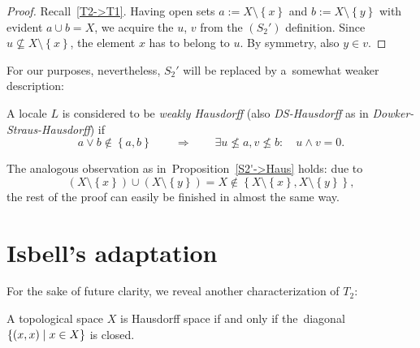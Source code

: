 \begin{proof}
  Recall~\ref{T2->T1}.
  Having open sets $a := X \setminus \left\{x\right\}$ and $b := X \setminus
  \left\{y\right\}$ with evident $a \cup b = X$, we acquire the $u$, $v$ from
  the $(S_2')$ definition.
  Since $u\not\subseteq X\setminus \left\{x\right\}$, the element $x$ has to
  belong to $u$.
  By symmetry, also $y \in v$.
\end{proof}

For our purposes, nevertheless, $S_2'$ will be replaced by a~somewhat weaker
description:

\begin{framed}
  \begin{df}[DS-Haus]
    A locale $L$ is considered to be \emph{weakly Hausdorff\/} (also
    \emph{DS-Hausdorff} as in \emph{Dowker-Straus-Hausdorff}) if
    \[
      a \vee b \not\in \left\{a, b\right\} \qquad \Rightarrow \qquad \exists
      u\not\leq a, v\not\leq b: \quad u \wedge v = 0.
    \]
  \end{df}
\end{framed}

\begin{rem}
  The analogous observation as in~Proposition~\ref{S2'->Haus} holds:
  due to
  \[
    (X \setminus \left\{x\right\}) \cup (X \setminus \left\{y\right\}) = X
    \not\in \left\{X \setminus \left\{x\right\}, X \setminus \left\{y\right\}
    \right\},
  \]
  the rest of the proof can easily be finished in almost the same way.
\end{rem}

\section{Isbell's adaptation}

For the sake of future clarity, we reveal another characterization of $T_2$:

\begin{prop}
  A topological space $X$ is Hausdorff space if and only if the~diagonal
  $\left\{(x, x) \mid x\in X \right\}$ is closed.
\end{prop}

